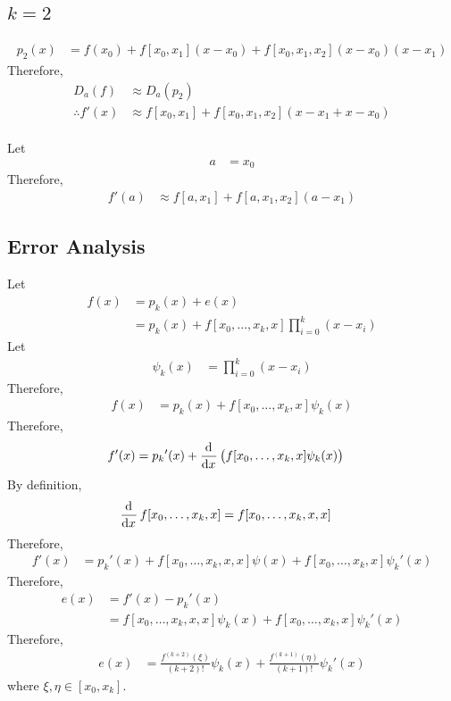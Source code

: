 \documentclass[fleqn, a4paper, 12pt, twoside, titlepage]{article}
\theoremstyle{definition}
\theoremstyle{theorem}
\begin{document}
\subsection{$k = 2$}

\begin{align*}
	p_2(x) &= f(x_0) + f[x_0,x_1] (x - x_0) + f[x_0,x_1,x_2] (x - x_0) (x - x_1)
\end{align*}
Therefore,
\begin{align*}
	D_a(f) &\approx D_a(p_2)\\
	\therefore f'(x) &\approx f[x_0,x_1] + f[x_0,x_1,x_2] (x - x_1 + x - x_0)
\end{align*}
~\\
Let
\begin{align*}
	a &= x_0
\end{align*}
Therefore,
\begin{align*}
	f'(a) &\approx f[a,x_1] + f[a,x_1,x_2] (a - x_1)
\end{align*}

\subsection{Error Analysis}

Let
\begin{align*}
	f(x) &= p_k(x) + e(x)\\
	&= p_k(x) + f[x_0,\dots,x_k,x] \prod\limits_{i = 0}^{k} (x - x_i)
\end{align*}
Let
\begin{align*}
	\psi_k(x) &= \prod\limits_{i = 0}^{k} (x - x_i)
\end{align*}
Therefore,
\begin{align*}
	f(x) &= p_k(x) + f[x_0,\dots,x_k,x] \psi_k(x)
\end{align*}
Therefore,
\begin{align*}
	f'(x) &= {p_k}'(x) + \dod{}{x}\left( f[x_0,\dots,x_k,x] \psi_k(x) \right)
\end{align*}
By definition,
\begin{align*}
	\dod{}{x}f[x_0,\dots,x_k,x] &= f[x_0,\dots,x_k,x,x]
\end{align*}
Therefore,
\begin{align*}
	f'(x) &= {p_k}'(x) + f[x_0,\dots,x_k,x,x] \psi(x) + f[x_0,\dots,x_k,x] {\psi_k}'(x)
\end{align*}
Therefore,
\begin{align*}
	e(x) &= f'(x) - {p_k}'(x)\\
	&= f[x_0,\dots,x_k,x,x] \psi_k(x) + f[x_0,\dots,x_k,x] {\psi_k}'(x)
\end{align*}
Therefore,
\begin{align*}
	e(x) &= \frac{f^{(k + 2)}(\xi)}{(k + 2)!} \psi_k(x) + \frac{f^{(k + 1)}(\eta)}{(k + 1)!} {\psi_k}'(x)
\end{align*}
where $\xi,\eta \in [x_0,x_k]$.
\end{document}
